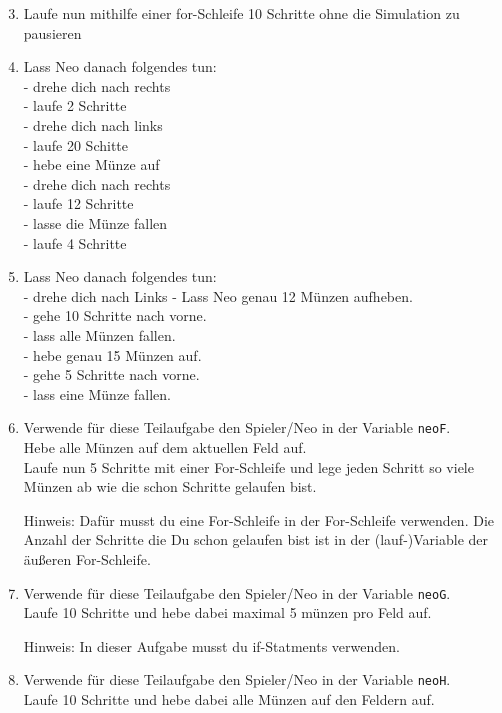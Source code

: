 \begin{enumerate}\setcounter{enumi}{2}
	\item 
		Laufe nun mithilfe einer for-Schleife 10 Schritte ohne die Simulation zu pausieren

	\item
		Lass Neo danach folgendes tun:\\
			- drehe dich nach rechts\\
			- laufe 2 Schritte\\
			- drehe dich nach links\\ 
			- laufe 20 Schitte\\
			- hebe eine Münze auf\\
			- drehe dich nach rechts\\
			- laufe 12 Schritte\\
			- lasse die Münze fallen\\
			- laufe 4 Schritte


	\item
		Lass Neo danach folgendes tun:\\
		- drehe dich nach Links
		- Lass Neo genau 12 Münzen aufheben. \\
		- gehe 10 Schritte nach vorne.\\
		- lass alle Münzen fallen.\\
		- hebe genau 15 Münzen auf.\\
		- gehe 5 Schritte nach vorne.\\
		- lass eine Münze fallen.

	\item
		Verwende für diese Teilaufgabe den Spieler/Neo in der Variable \lstinline{neoF}.\\
		Hebe alle Münzen auf dem aktuellen Feld auf. \\
		Laufe nun 5 Schritte mit einer For-Schleife und lege jeden Schritt so viele Münzen ab wie die schon Schritte gelaufen bist.

		Hinweis: Dafür musst du eine For-Schleife in der For-Schleife verwenden. 
		Die Anzahl der Schritte die Du schon gelaufen bist ist in der (lauf-)Variable der äußeren For-Schleife.


	\item
		Verwende für diese Teilaufgabe den Spieler/Neo in der Variable \lstinline{neoG}.\\
		Laufe 10 Schritte und hebe dabei maximal 5 münzen pro Feld auf.

		Hinweis: In dieser Aufgabe musst du if-Statments verwenden.

	\item
		Verwende für diese Teilaufgabe den Spieler/Neo in der Variable \lstinline{neoH}.\\
		Laufe 10 Schritte und hebe dabei alle Münzen auf den Feldern auf.
\end{enumerate}
\newpage

